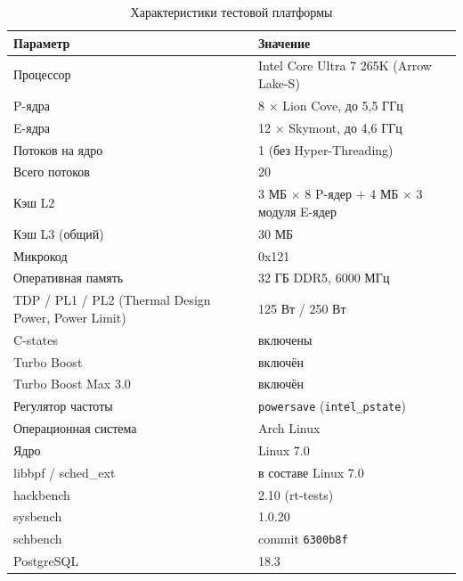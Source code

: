 \documentclass[14pt, oneside]{extbook}
\begin{document}
        \begin{table}[h]
                \centering
                \caption{Характеристики тестовой платформы}
                \label{tab:hardware}
                \vspace{0.4em}
                \begin{tabular}{|P{6cm}|P{8.5cm}|}
                        \hline
                        Параметр & Значение \\
                        \hline
                        Процессор & Intel Core Ultra 7 265K (Arrow Lake-S) \\
                        P-ядра & 8 $\times$ Lion Cove, до 5,5 ГГц \\
                        E-ядра & 12 $\times$ Skymont, до 4,6 ГГц \\
                        Потоков на ядро & 1 (без Hyper-Threading) \\
                        Всего потоков & 20 \\
                        Кэш L2 & 3 МБ $\times$ 8 P-ядер $+$ 4 МБ $\times$ 3 модуля E-ядер \\
                        Кэш L3 (общий) & 30 МБ \\
                        Микрокод & 0x121 \\
                        Оперативная память & 32 ГБ DDR5, 6000 МГц \\
                        TDP / PL1 / PL2 (Thermal Design Power, Power Limit) & 125 Вт / 250 Вт \\
                        C-states & включены \\
                        Turbo Boost & включён \\
                        Turbo Boost Max 3.0 & включён \\
                        Регулятор частоты & \texttt{powersave} (\texttt{intel\_pstate}) \\
                        Операционная система & Arch Linux \\
                        Ядро & Linux 7.0 \\
                        libbpf / sched\_ext & в составе Linux 7.0 \\
                        hackbench & 2.10 (rt-tests) \\
                        sysbench & 1.0.20 \\
                        schbench & commit \texttt{6300b8f} \\
                        PostgreSQL & 18.3 \\
                        \hline
                \end{tabular}
        \end{table}
\end{document}
